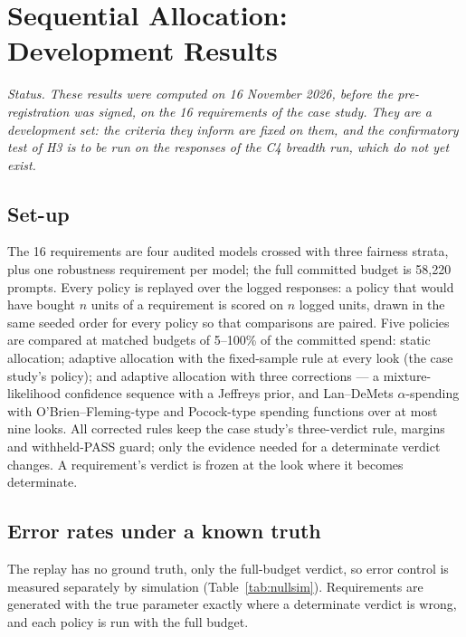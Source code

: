 \chapter{Sequential Allocation: Development Results}
\label{ch:rq3dev}

\noindent\emph{Status. These results were computed on 16 November 2026, before the pre-registration was signed, on the 16 requirements of the case study. They are a development set: the criteria they inform are fixed on them, and the confirmatory test of H3 is to be run on the responses of the C4 breadth run, which do not yet exist.}

\section{Set-up}
The 16 requirements are four audited models crossed with three fairness strata, plus one robustness requirement per model; the full committed budget is 58{,}220 prompts. Every policy is replayed over the logged responses: a policy that would have bought $n$ units of a requirement is scored on $n$ logged units, drawn in the same seeded order for every policy so that comparisons are paired. Five policies are compared at matched budgets of 5--100\% of the committed spend: static allocation; adaptive allocation with the fixed-sample rule at every look (the case study's policy); and adaptive allocation with three corrections --- a mixture-likelihood confidence sequence with a Jeffreys prior, and Lan--DeMets $\alpha$-spending with O'Brien--Fleming-type and Pocock-type spending functions over at most nine looks. All corrected rules keep the case study's three-verdict rule, margins and withheld-PASS guard; only the evidence needed for a determinate verdict changes. A requirement's verdict is frozen at the look where it becomes determinate.

\section{Error rates under a known truth}
The replay has no ground truth, only the full-budget verdict, so error control is measured separately by simulation (Table~\ref{tab:nullsim}). Requirements are generated with the true parameter exactly where a determinate verdict is wrong, and each policy is run with the full budget.

